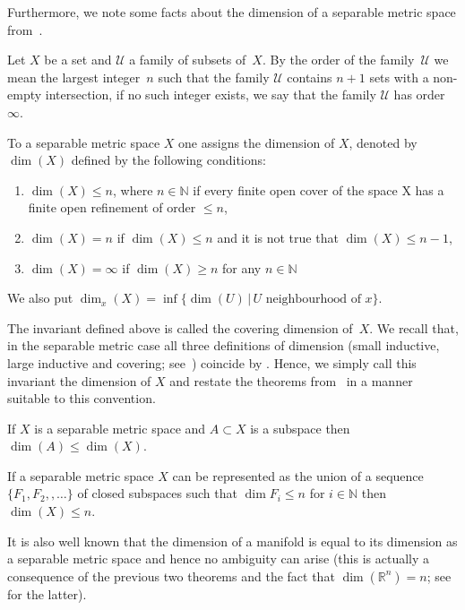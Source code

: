 Furthermore, we note some facts about the dimension of a separable metric space from~\cite{E}.
\begin{defi} Let $X$ be a set and $\mathcal{U}$ a family of subsets of~$X$. By the order of the family~$\mathcal{U}$ we mean the largest integer~$n$ such that the family $\mathcal{U}$ contains $n+ 1$ sets with a non-empty intersection, if no such integer exists, we say that the family $\mathcal{U}$ has order $\infty$.
\end{defi}
\begin{defi} To a separable metric space $X$ one assigns the dimension of $X$, denoted by $\dim(X)$ defined by the following conditions:
\begin{enumerate}\itemsep=0pt
\item[1)] $\dim(X) \leq n$, where $n\in\mathbb{N}$ if every finite open cover of the space X has a finite open refinement of order $\leq n$,
\item[2)] $\dim(X)=n$ if $\dim(X) \leq n$ and it is not true that $\dim(X) \leq n- 1$,
\item[3)] $\dim(X)=\infty$ if $\dim(X)\geq n$ for any $n\in\mathbb{N}$
\end{enumerate}
We also put $\dim_x(X)=\inf\{\dim(U) \,|\, U \text{ neighbourhood of } x\}$.
\end{defi}
\begin{rem} The invariant defined above is called the covering dimension of~$X$. We recall that, in the separable metric case all three definitions of dimension (small inductive, large inductive and covering; see~\cite{E}) coincide by \cite[Theorem~1.7.7]{E}. Hence, we simply call this invariant the dimension of $X$ and restate the theorems from~\cite{E} in a manner suitable to this convention.
\end{rem}
\begin{tw}[{\cite[Theorem~1.1.2]{E}}] If $X$ is a separable metric space and $A\subset X$ is a subspace then $\dim(A)\leq \dim(X)$.
\end{tw}
\begin{tw} If a separable metric space $X$ can be represented as the union of a sequence $\{F_1, F_2,, \dots\}$ of closed subspaces such that $\dim{F_i}\leq n$ for $i\in\mathbb{N}$ then $\dim(X) \leq n$.
\end{tw}

It is also well known that the dimension of a manifold is equal to its dimension as a separable metric space and hence no ambiguity can arise (this is actually a consequence of the previous two theorems and the fact that $\dim(\mathbb{R}^n)=n$; see \cite[Theorem~1.8.2]{E} for the latter).

